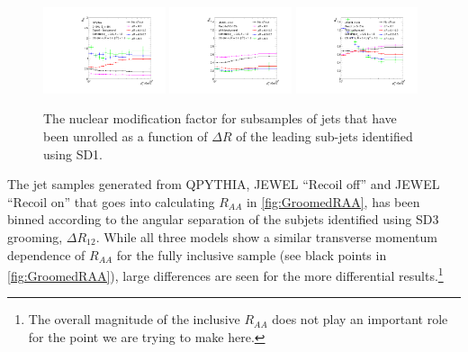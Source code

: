 \begin{figure}[th]
\centering
\includegraphics[width=0.32\textwidth]{figures/Observables_RAA/Plot9}
\includegraphics[width=0.32\textwidth]{figures/Observables_RAA/Plot3}
\includegraphics[width=0.32\textwidth]{figures/Observables_RAA/Plot4}
\caption{The nuclear modification factor for subsamples of jets that have been unrolled as a function of $\Delta R$ of the leading sub-jets identified using SD1. 
}
\label{fig:GroomedRAA}
\end{figure}
The jet samples generated from QPYTHIA, JEWEL ``Recoil off'' and JEWEL ``Recoil on'' that goes into calculating $R_{AA}$ in \autoref{fig:GroomedRAA}, has been binned according to the angular separation of the subjets identified using SD3 grooming, $\Delta R_{12}$. While all three models show a similar transverse momentum dependence of $R_{AA}$ for the fully inclusive sample (see black points in \autoref{fig:GroomedRAA}), large differences are seen for the more differential  results.\footnote{The overall magnitude of the inclusive $R_{AA}$ does not play an important role for the point we are trying to make here.} 

